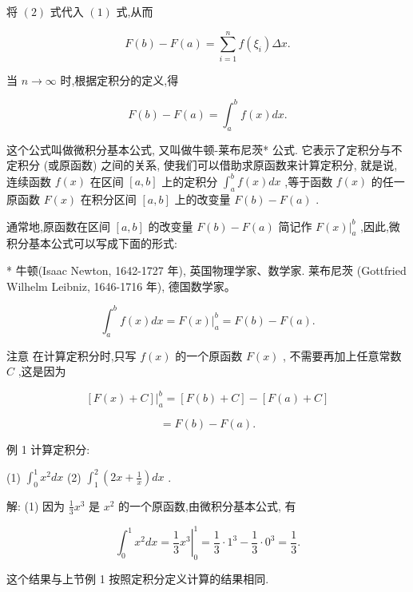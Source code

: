 \documentclass[lang=cn,newtx,10pt,scheme=chinese]{elegantbook}
\begin{document}
将 \(\left( 2\right)\) 式代入 \(\left( 1\right)\) 式,从而

\[
F\left( b\right) - F\left( a\right) = \mathop{\sum }\limits_{{i = 1}}^{n}f\left( {\xi }_{i}\right) {\Delta x}.
\]

当 \(n \rightarrow \infty\) 时,根据定积分的定义,得

\[
F\left( b\right) - F\left( a\right) = {\int }_{a}^{b}f\left( x\right) {dx}.
\]

这个公式叫做微积分基本公式, 又叫做牛顿-莱布尼茨* 公式. 它表示了定积分与不定积分 (或原函数) 之间的关系, 使我们可以借助求原函数来计算定积分, 就是说, 连续函数 \(f\left( x\right)\) 在区间 \(\left\lbrack {a,b}\right\rbrack\) 上的定积分 \({\int }_{a}^{b}f\left( x\right) {dx}\) ,等于函数 \(f\left( x\right)\) 的任一原函数 \(F\left( x\right)\) 在积分区间 \(\left\lbrack {a,b}\right\rbrack\) 上的改变量 \(F\left( b\right) - F\left( a\right)\) .

通常地,原函数在区间 \(\left\lbrack {a,b}\right\rbrack\) 的改变量 \(F\left( b\right) - F\left( a\right)\) 简记作 \({\left. F\left( x\right) \right| }_{a}^{b}\) ,因此,微积分基本公式可以写成下面的形式:

* 牛顿(Isaac Newton, 1642-1727 年), 英国物理学家、数学家. 莱布尼茨 (Gottfried Wilhelm Leibniz, 1646-1716 年), 德国数学家。

\[
{\int }_{a}^{b}f\left( x\right) {dx} = {\left. F\left( x\right) \right| }_{a}^{b} = F\left( b\right) - F\left( a\right) .
\]

注意 在计算定积分时,只写 \(f\left( x\right)\) 的一个原函数 \(F\left( x\right)\) , 不需要再加上任意常数 \(C\) ,这是因为

\[
{\left. \left\lbrack F\left( x\right) + C\right\rbrack \right| }_{a}^{b} = \left\lbrack {F\left( b\right) + C}\right\rbrack - \left\lbrack {F\left( a\right) + C}\right\rbrack
\]

\[
= F\left( b\right) - F\left( a\right) \text{.}
\]

例 1 计算定积分:

(1) \({\int }_{0}^{1}{x}^{2}{dx}\) (2) \({\int }_{1}^{2}\left( {{2x} + \frac{1}{x}}\right) {dx}\) .

解: (1) 因为 \(\frac{1}{3}{x}^{3}\) 是 \({x}^{2}\) 的一个原函数,由微积分基本公式, 有

\[
{\int }_{0}^{1}{x}^{2}{dx} = {\left. \frac{1}{3}{x}^{3}\right| }_{0}^{1} = \frac{1}{3} \cdot {1}^{3} - \frac{1}{3} \cdot {0}^{3} = \frac{1}{3}.
\]

这个结果与上节例 1 按照定积分定义计算的结果相同.
\end{document}

